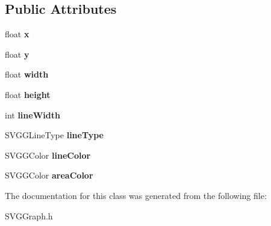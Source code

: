 \subsection*{Public Attributes}
\begin{DoxyCompactItemize}
\item 
\hypertarget{classSVGGRectangle_a9cbbd40377b1974ebb4d23e433c74c17}{
float {\bfseries x}}
\label{classSVGGRectangle_a9cbbd40377b1974ebb4d23e433c74c17}

\item 
\hypertarget{classSVGGRectangle_a09a4a21ab2e47aa66ac53f8176740a7e}{
float {\bfseries y}}
\label{classSVGGRectangle_a09a4a21ab2e47aa66ac53f8176740a7e}

\item 
\hypertarget{classSVGGRectangle_afd780bd3d34ad3a8be3091c4bb48b21a}{
float {\bfseries width}}
\label{classSVGGRectangle_afd780bd3d34ad3a8be3091c4bb48b21a}

\item 
\hypertarget{classSVGGRectangle_a97f5593a4715f352ebf803e106959433}{
float {\bfseries height}}
\label{classSVGGRectangle_a97f5593a4715f352ebf803e106959433}

\item 
\hypertarget{classSVGGRectangle_a327995b00c7597dc22eaf7d3218f8654}{
int {\bfseries lineWidth}}
\label{classSVGGRectangle_a327995b00c7597dc22eaf7d3218f8654}

\item 
\hypertarget{classSVGGRectangle_adb3b4586a44cab2e8c3607b7f3b09615}{
SVGGLineType {\bfseries lineType}}
\label{classSVGGRectangle_adb3b4586a44cab2e8c3607b7f3b09615}

\item 
\hypertarget{classSVGGRectangle_a72c7627565f2d54a4744256a67db10cc}{
SVGGColor {\bfseries lineColor}}
\label{classSVGGRectangle_a72c7627565f2d54a4744256a67db10cc}

\item 
\hypertarget{classSVGGRectangle_aadf7246100699d8f009bf0a32eb6a154}{
SVGGColor {\bfseries areaColor}}
\label{classSVGGRectangle_aadf7246100699d8f009bf0a32eb6a154}

\end{DoxyCompactItemize}


The documentation for this class was generated from the following file:\begin{DoxyCompactItemize}
\item 
SVGGraph.h\end{DoxyCompactItemize}
